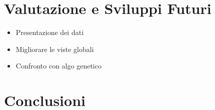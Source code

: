 \documentclass[a4paper,10pt,abstracton]{scrartcl}
\begin{document}
\section{Valutazione e Sviluppi Futuri}
\begin{itemize}
 \item Presentazione dei dati
 \item Migliorare le viste globali
 \item Confronto con algo genetico
\end{itemize}



\section{Conclusioni}





\end{document}
